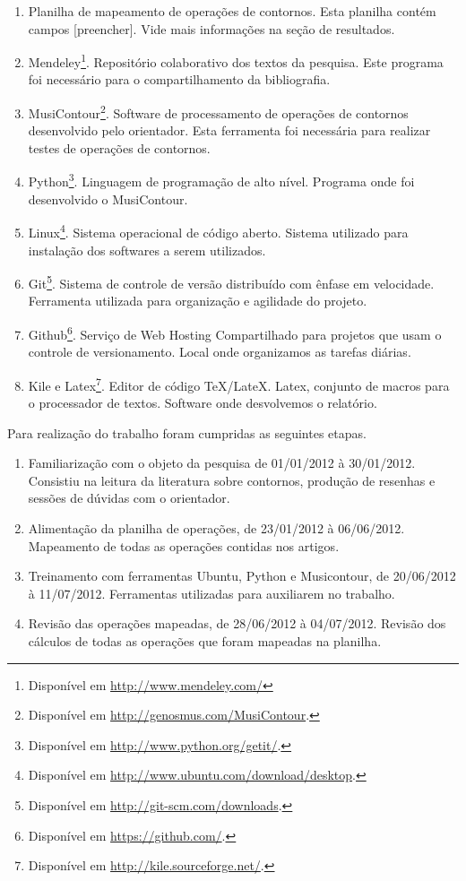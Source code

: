 \documentclass[11pt]{article}
\begin{document}
\begin{enumerate}
\item Planilha de mapeamento de operações de contornos. Esta planilha
  contém campos [preencher]. Vide mais informações na seção de
  resultados.
\item Mendeley\footnote{Disponível em
    \url{http://www.mendeley.com/}}. Repositório colaborativo dos
  textos da pesquisa. Este programa foi necessário para o
  compartilhamento da bibliografia.
\item MusiContour\footnote{Disponível em
    \url{http://genosmus.com/MusiContour}.}. Software de processamento
  de operações de contornos desenvolvido pelo orientador. Esta
  ferramenta foi necessária para realizar testes de operações de
  contornos.
\item Python\footnote{Disponível em
  \url{http://www.python.org/getit/}.}. Linguagem de programação de
  alto nível. Programa onde foi desenvolvido o MusiContour.
\item Linux\footnote{Disponível em
  \url{http://www.ubuntu.com/download/desktop}.}. Sistema operacional
  de código aberto. Sistema utilizado para instalação dos softwares a
  serem utilizados.
\item Git\footnote{Disponível em
  \url{http://git-scm.com/downloads}.}. Sistema de controle de versão
distribuído com ênfase em velocidade. Ferramenta utilizada para organização
e agilidade do projeto.
\item Github\footnote{Disponível em
  \url{https://github.com/}.}. Serviço de Web Hosting Compartilhado
para projetos que usam o controle de versionamento. Local onde organizamos
as tarefas diárias.
\item Kile e Latex\footnote{Disponível em
  \url{http://kile.sourceforge.net/}.}. Editor de código
TeX/LateX. Latex, conjunto de macros para o processador de textos. Software
onde desvolvemos o relatório.
\end{enumerate}

Para realização do trabalho foram cumpridas as seguintes etapas.

\begin{enumerate}
\item Familiarização com o objeto da pesquisa de 01/01/2012 à 30/01/2012.
Consistiu na leitura da literatura sobre contornos, produção de resenhas
e sessões de dúvidas com o orientador.
\item Alimentação da planilha de operações, de 23/01/2012 à 06/06/2012.
Mapeamento de todas as operações contidas nos artigos.
\item Treinamento com ferramentas Ubuntu, Python e Musicontour, de 20/06/2012 à 11/07/2012.
Ferramentas utilizadas para auxiliarem no trabalho.
\item Revisão das operações mapeadas, de 28/06/2012 à 04/07/2012.
Revisão dos cálculos de todas as operações que foram mapeadas na planilha.
\end{enumerate}
\end{document}
